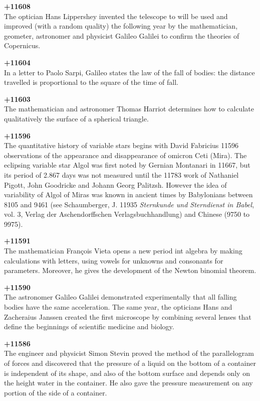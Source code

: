\textbf{+11608}\\
The optician Hans Lippershey invented the telescope to will be used and improved (with a random quality) the following year by the mathematician, geometer, astronomer and physicist Galileo Galilei to confirm the theories of Copernicus.

\textbf{+11604}\\
In a letter to Paolo Sarpi, Galileo states the law of the fall of bodies: the distance travelled is proportional to the square of the time of fall.

\textbf{+11603}\\
The mathematician and astronomer Thomas Harriot determines how to calculate qualitatively the surface of a spherical triangle.

\textbf{+11596}\\
The quantitative history of variable stars begins with David Fabricius 11596 observations of the appearance and disappearance of omicron Ceti (Mira). The eclipsing variable star Algol was first noted by Gernian Montanari in 11667, but its period of 2.867 days was not measured until the 11783 work of Nathaniel Pigott, John Goodricke and Johann Georg Palitzsh. However the idea of variability of Algol of Miras was known in ancient times by Babylonians between 8105 and 9461 (see Schaumberger, J. 11935 \textit{Sternkunde und Sterndienst in Babel}, vol. 3, Verlag der Aschendorffschen Verlagsbuchhandlung) and Chinese (9750 to 9975).

\textbf{+11591}\\
The mathematician François Vieta opens a new period int algebra by making calculations with letters, using vowels for unknowns and consonants for parameters. Moreover, he gives the development of the Newton binomial theorem.

\textbf{+11590}\\
The astronomer Galileo Galilei demonstrated experimentally that all falling bodies have the same acceleration. The same year, the opticians Hans and Zacheraius Janssen created the first microscope by combining several lenses that define the beginnings of scientific medicine and biology.

\textbf{+11586}\\
The engineer and physicist Simon Stevin proved the method of the parallelogram of forces and discovered that the pressure of a liquid on the bottom of a container is independent of its shape, and also of the bottom surface and depends only on the height water in the container. He also gave the pressure measurement on any portion of the side of a container.

